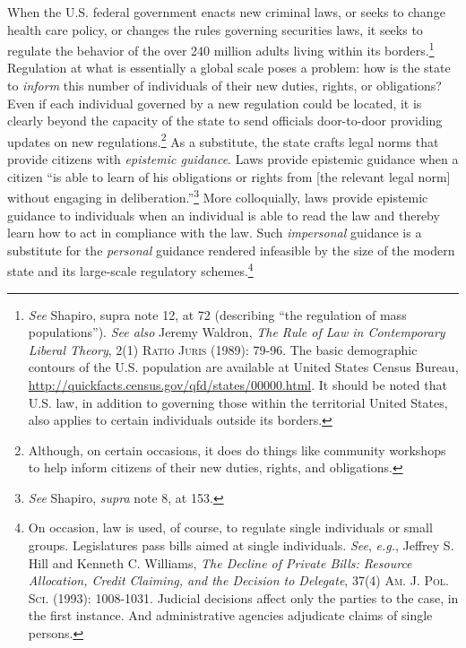 When the U.S. federal government enacts new criminal laws, or seeks to
change health care policy, or changes the rules governing securities
laws, it seeks to regulate the behavior of the over 240 million adults
living within its borders.\footnote{\emph{See} Shapiro, supra note 12,
  at 72 (describing ``the regulation of mass populations''). \emph{See
  also} Jeremy Waldron, \emph{The Rule of Law in Contemporary Liberal
  Theory}, 2(1) \textsc{Ratio Juris} (1989): 79-96. The basic
  demographic contours of the U.S. population are available at United
  States Census Bureau,
  \href{../customXml/item1.xml}{http://quickfacts.census.gov/qfd/states/00000.html}.
  It should be noted that U.S. law, in addition to governing those
  within the territorial United States, also applies to certain
  individuals outside its borders.} Regulation at what is essentially a
global scale poses a problem: how is the state to \emph{inform} this
number of individuals of their new duties, rights, or obligations? Even
if each individual governed by a new regulation could be located, it is
clearly beyond the capacity of the state to send officials door-to-door
providing updates on new regulations.\footnote{Although, on certain
  occasions, it does do things like community workshops to help inform
  citizens of their new duties, rights, and obligations.} As a
substitute, the state crafts legal norms that provide citizens with
\emph{epistemic guidance}. Laws provide epistemic guidance when a
citizen ``is able to learn of his obligations or rights from {[}the
relevant legal norm{]} without engaging in deliberation.''\footnote{\emph{See}
  Shapiro, \emph{supra} note 8, at 153.} More colloquially, laws provide
epistemic guidance to individuals when an individual is able to read the
law and thereby learn how to act in compliance with the law. Such
\emph{impersonal} guidance is a substitute for the \emph{personal}
guidance rendered infeasible by the size of the modern state and its
large-scale regulatory schemes.\footnote{On occasion, law is used, of
  course, to regulate single individuals or small groups. Legislatures
  pass bills aimed at single individuals. \emph{See}, \emph{e.g.},
  Jeffrey S. Hill and Kenneth C. Williams, \emph{The Decline of Private
  Bills: Resource Allocation, Credit Claiming, and the Decision to
  Delegate}, 37(4) \textsc{Am. J. Pol. Sci. (1993): 1008-1031.} Judicial
  decisions affect only the parties to the case, in the first instance.
  And administrative agencies adjudicate claims of single persons.}

